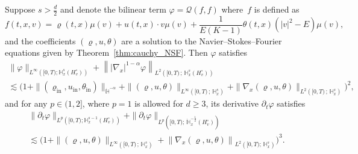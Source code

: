\documentclass[AHL,Unicode,longabstracts,published]{cedram}
\newcommand{\ini}{\mathrm{in}}
\newcommand{\bbH}{\mathbb{H}}
\newcommand{\QQ}{\mathcal{Q}}
\newcommand{\Ssm}{H^{\circ}}
\renewcommand*\ge{\geqslant}
\begin{document}
\begin{lemm}\label{lem:estimates_derivative_Q_navier_stokes}
Suppose $s > \frac{d}{2}$ and denote the bilinear term $\varphi = \QQ(f, f)$ where~$f$ is defined as
\[
f(t, x, v) = \varrho(t, x) \mu(v) + u(t, x) \cdot v \mu(v) + \frac{1}{E(K-1)} \theta(t, x) \left(|v|^2 - E \right) \mu(v),
\]
and the coefficients $(\varrho, u, \theta)$ are a solution to the Navier--Stokes--Fourier equations given by Theorem~\ref{thm:cauchy_NSF}. Then $\varphi$ satisfies
\begin{multline*}
\| \varphi  \|_{ L^\infty \left([0, T) ; \bbH^s_x \left(\Ssm_v \right) \right) } + \left\| | \nabla_x |^{1-\alpha} \varphi \right\|_{ L^2 \left([0, T)\,;\,\bbH^s_x \left(\Ssm_v \right) \right) } \\
 \lesssim \Big(1 + \| (\varrho_\ini, u_\ini, \theta_\ini) \|_{ \dot{\bbH}^{-\alpha} } + \| (\varrho, u, \theta) \|_{ L^\infty\left([0, T)\,;\,\bbH^{s}_x \right) } + \| \nabla_x (\varrho, u, \theta) \|_{ L^2\left([0, T)\,;\, \bbH^{s}_x \right) }\Big)^2,
\end{multline*}
and for any $p \in (1, 2]$, where $p = 1$ is allowed for $d \ge 3$, its derivative $\partial_{t} \varphi$ satisfies
\begin{multline*}
\| \partial_t \varphi \|_{ L^p\left([0, T) ; \bbH^{s-1}_x(\Ssm_v) \right) }  + \| \partial_t \varphi \|_{ L^p\left([0, T);\,\dot{\bbH}^{-\frac{1}{2}}_x (\Ssm_v)\right) } \\
 \lesssim \Big(1 + \| (\varrho, u, \theta) \|_{ L^\infty\left([0, T)\,;\,\bbH^{s}_x \right) } + \left\| \nabla_x (\varrho, u, \theta) \right\|_{ L^2\left([0, T);\,\bbH^{s}_x \right) }\Big)^3.
\end{multline*}
\end{lemm}
\end{document}
